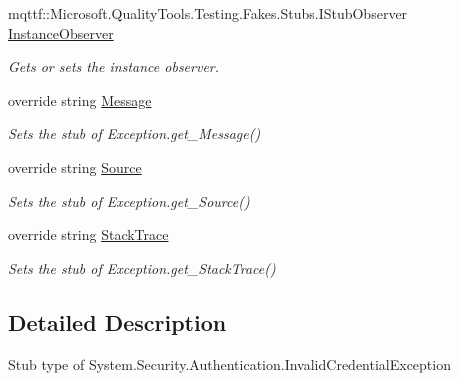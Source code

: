 \begin{DoxyCompactItemize}
mqttf\-::\-Microsoft.\-Quality\-Tools.\-Testing.\-Fakes.\-Stubs.\-I\-Stub\-Observer \hyperlink{class_system_1_1_security_1_1_authentication_1_1_fakes_1_1_stub_invalid_credential_exception_ac314dfade4aa72eff4039faf154d0833}{Instance\-Observer}
\begin{DoxyCompactList}\small\item\em Gets or sets the instance observer.\end{DoxyCompactList}\item 
override string \hyperlink{class_system_1_1_security_1_1_authentication_1_1_fakes_1_1_stub_invalid_credential_exception_aba0edcd609451006c8ca6303e3bd9194}{Message}
\begin{DoxyCompactList}\small\item\em Sets the stub of Exception.\-get\-\_\-\-Message()\end{DoxyCompactList}\item 
override string \hyperlink{class_system_1_1_security_1_1_authentication_1_1_fakes_1_1_stub_invalid_credential_exception_ad54a9acf368e24239f20d4ab4dc6552a}{Source}
\begin{DoxyCompactList}\small\item\em Sets the stub of Exception.\-get\-\_\-\-Source()\end{DoxyCompactList}\item 
override string \hyperlink{class_system_1_1_security_1_1_authentication_1_1_fakes_1_1_stub_invalid_credential_exception_aef73f1951833e5e1b53154815ba9e201}{Stack\-Trace}
\begin{DoxyCompactList}\small\item\em Sets the stub of Exception.\-get\-\_\-\-Stack\-Trace()\end{DoxyCompactList}\end{DoxyCompactItemize}


\subsection{Detailed Description}
Stub type of System.\-Security.\-Authentication.\-Invalid\-Credential\-Exception



